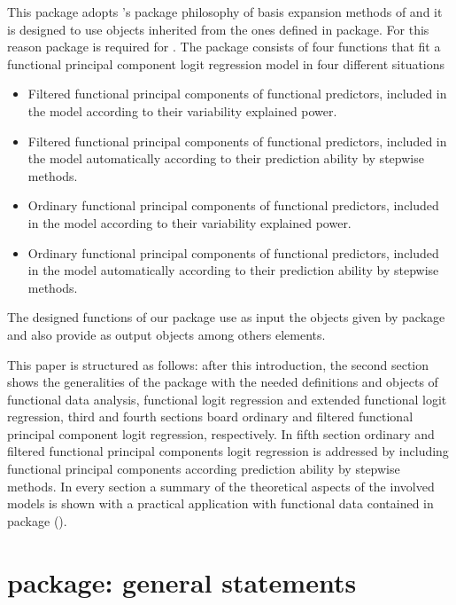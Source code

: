 This package adopts 's package philosophy of basis expansion methods of \cite{Ramsay09} and it is designed to use objects inherited from the ones defined in  package. For this reason  package is required for . The package consists of four functions that fit a functional principal component logit regression model in four different situations
\begin{itemize}
 \item Filtered functional principal components of functional predictors, included in the model according to their variability explained power.
 \item Filtered functional principal components  of functional predictors, included in the model automatically according to their prediction ability by stepwise methods.
 \item Ordinary functional principal components of functional predictors, included in the model according to their variability explained power.
 \item Ordinary functional principal components of functional predictors, included in the model automatically according to their prediction ability by stepwise methods.
\end{itemize}

The designed functions of our package use as input the  objects given by  package and also provide as output  objects among others elements.

This paper is structured as follows: after this introduction, the second section shows the generalities of the package with the needed definitions and objects of functional data analysis, functional logit regression and extended functional logit regression, third and fourth sections board ordinary and filtered functional principal component logit regression, respectively. In fifth section ordinary and filtered functional principal components logit regression is addressed by including functional principal components according prediction ability by stepwise methods. In every section a summary of the theoretical aspects of the involved models is shown with a practical application with functional data contained in  package (\citealp{Febrero2012}).

\section{ package: general statements}


